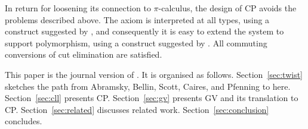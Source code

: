 \documentclass{jfp1}
\begin{document}
In return for loosening its connection to $\pi$-calculus, the design
of CP avoids the problems described above.  The axiom is interpreted
at all types, using a construct suggested by \citet{CairesEtAl12},
and consequently it is easy to extend the system to support
polymorphism, using a construct suggested by \citet{Turner95}.
All commuting conversions of cut elimination are satisfied.

This paper is the journal version of \citet{Wadler12}.
It is organised as follows.
Section~\ref{sec:twist} sketches the path from 
Abramsky, Bellin, Scott, Caires, and Pfenning to here.
Section~\ref{sec:cll} presents CP.
Section~\ref{sec:gv} presents GV and its translation to CP.
Section~\ref{sec:related} discusses related work.
Section~\ref{sec:conclusion} concludes.




\end{document}
